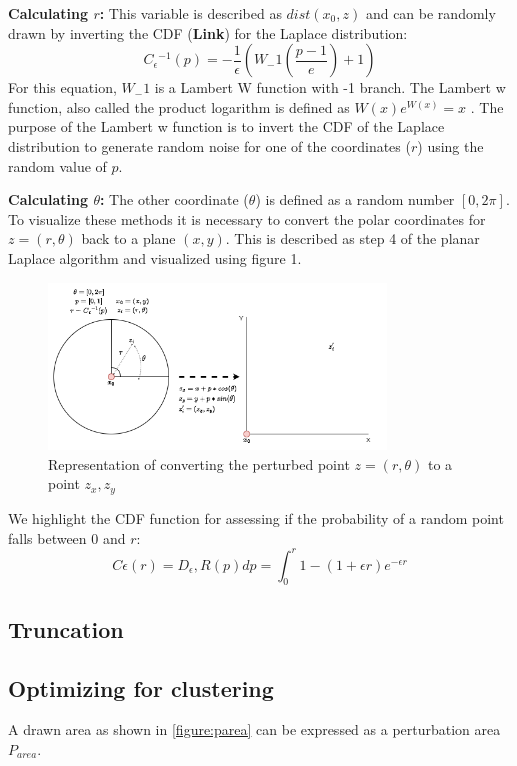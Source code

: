\textbf{Calculating $r$:}
This variable is described as $dist(x_0, z)$ and can be randomly drawn by inverting the CDF (\textbf{Link}) for the Laplace distribution:
\begin{equation}
  C{_\epsilon}{^{-1}}(p) = - \frac{1}{\epsilon}(W_-1 (\frac{p - 1}{e}) + 1)
\end{equation}
For this equation, $W_-1$ is a Lambert W function with -1 branch.
The Lambert w function, also called the product logarithm is defined as $W(x)e^{W(x)} = x$ \citep{lehtonen_lambert_2016}.
The purpose of the Lambert w function is to invert the CDF of the Laplace distribution to generate random noise for one of the coordinates ($r$) using the random value of $p$.

\textbf{Calculating $\theta$:}
The other coordinate ($\theta$) is defined as a random number $[0, 2\pi]$. \newline \newline
To visualize these methods it is necessary to convert the polar coordinates for $z = (r, \theta)$ back to a plane $(x, y)$.
This is described as step 4 of the planar Laplace algorithm \citep{DBLP:journals/corr/abs-1212-1984} and visualized using figure 1.
\begin{figure}[h]
  \includegraphics[width=0.8\textwidth]{TheorethicalFramework/ND-Laplace/Images/polar-laplace-to-planar.png}
  \centering
  \caption{Representation of converting the perturbed point $z = (r, \theta)$ to a point ${z_x, z_y}$}
\end{figure}

We highlight the CDF function  for assessing if the probability of a random point falls between 0 and $r$:
\begin{equation}
  C{\epsilon}(r) = D_\epsilon,R(p)dp = \int_{0}^{r} 1 - (1 + \epsilon r ) e^{-\epsilon r}
\end{equation}

\subsection{Truncation}
\subsection{Optimizing for clustering}
A drawn area as shown in \ref{figure:parea} can be expressed as a perturbation area $P_{area}$.